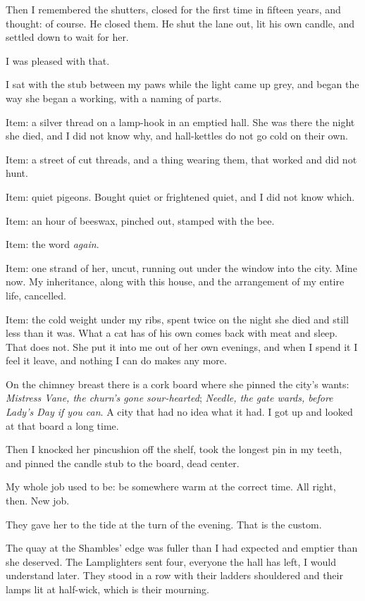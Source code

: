 Then I remembered the shutters, closed for the first time in fifteen years, and thought: of course. He closed them. He shut the lane out, lit his own candle, and settled down to wait for her.

I was pleased with that.

I sat with the stub between my paws while the light came up grey, and began the way she began a working, with a naming of parts.

Item: a silver thread on a lamp-hook in an emptied hall. She was there the night she died, and I did not know why, and hall-kettles do not go cold on their own.

Item: a street of cut threads, and a thing wearing them, that worked and did not hunt.

Item: quiet pigeons. Bought quiet or frightened quiet, and I did not know which.

Item: an hour of beeswax, pinched out, stamped with the bee.

Item: the word \emph{again}.

Item: one strand of her, uncut, running out under the window into the city. Mine now. My inheritance, along with this house, and the arrangement of my entire life, cancelled.

Item: the cold weight under my ribs, spent twice on the night she died and still less than it was. What a cat has of his own comes back with meat and sleep. That does not. She put it into me out of her own evenings, and when I spend it I feel it leave, and nothing I can do makes any more.

On the chimney breast there is a cork board where she pinned the city's wants: \emph{Mistress Vane, the churn's gone sour-hearted}; \emph{Needle, the gate wards, before Lady's Day if you can}. A city that had no idea what it had. I got up and looked at that board a long time.

Then I knocked her pincushion off the shelf, took the longest pin in my teeth, and pinned the candle stub to the board, dead center.

My whole job used to be: be somewhere warm at the correct time. All right, then. New job.

\scenebreak

They gave her to the tide at the turn of the evening. That is the custom.

The quay at the Shambles' edge was fuller than I had expected and emptier than she deserved. The Lamplighters sent four, everyone the hall has left, I would understand later. They stood in a row with their ladders shouldered and their lamps lit at half-wick, which is their mourning.

